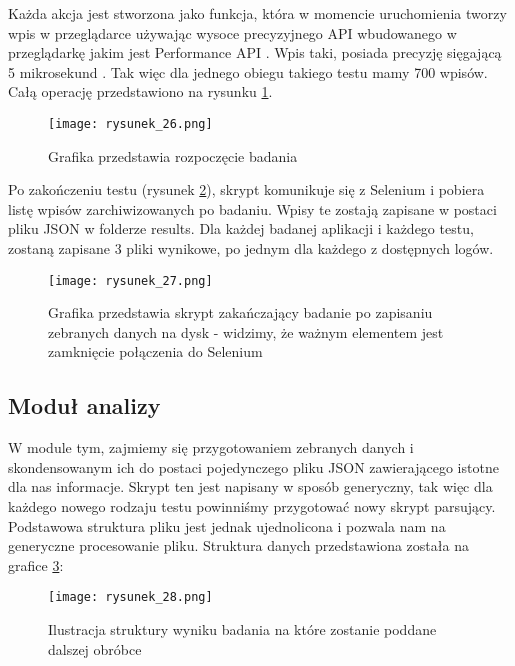 Każda akcja jest stworzona jako funkcja, która w momencie uruchomienia tworzy wpis w przeglądarce używając wysoce precyzyjnego API wbudowanego
w przeglądarkę jakim jest Performance API \cite{mozilla-perf}. Wpis taki, posiada precyzję sięgającą 5 mikrosekund \cite{mozilla-high-res-api}.
Tak więc dla jednego obiegu takiego testu mamy 700 wpisów. Całą operację przedstawiono na rysunku \ref{fig:rysunek_26}.

\begin{figure}[htbp]
    \centering
    \texttt{[image: rysunek\_26.png]}
    \caption{Grafika przedstawia rozpoczęcie badania}
    \label{fig:rysunek_26}
\end{figure}

Po zakończeniu testu (rysunek \ref{fig:rysunek_27}), skrypt komunikuje się z Selenium i pobiera listę wpisów zarchiwizowanych po badaniu.
Wpisy te zostają zapisane w postaci pliku JSON w folderze results.
Dla każdej badanej aplikacji i każdego testu, zostaną zapisane 3 pliki wynikowe, po jednym dla każdego z dostępnych logów.

\begin{figure}[htbp]
    \centering
    \texttt{[image: rysunek\_27.png]}
    \caption{Grafika przedstawia skrypt zakańczający badanie po zapisaniu zebranych danych na dysk - widzimy, że ważnym elementem jest zamknięcie połączenia do Selenium}
    \label{fig:rysunek_27}
\end{figure}

\subsection{Moduł analizy}

W module tym, zajmiemy się przygotowaniem zebranych danych i skondensowanym ich do postaci pojedynczego pliku JSON zawierającego istotne dla nas informacje.
Skrypt ten jest napisany w sposób generyczny, tak więc dla każdego nowego rodzaju testu powinniśmy przygotować nowy skrypt parsujący.
Podstawowa struktura pliku jest jednak ujednolicona i pozwala nam na generyczne procesowanie pliku. Struktura danych przedstawiona została na grafice \ref{fig:rysunek_28}:

\begin{figure}[htbp]
    \centering
    \texttt{[image: rysunek\_28.png]}
    \caption{Ilustracja struktury wyniku badania na które zostanie poddane dalszej obróbce}
    \label{fig:rysunek_28}
\end{figure}

